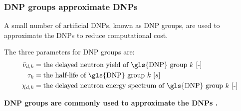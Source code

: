 \begin{frame}
  \frametitle{DNP groups approximate DNPs}
        A small number of artificial \glspl{DNP}, known as \gls{DNP} groups, are used to approximate the \glspl{DNP} to reduce computational cost.

        \begin{block}{The three parameters for \gls{DNP} groups are:}
            \[
            \begin{aligned}
                \bar{\nu}_{d, k} &= \text{the delayed neutron yield of \gls{DNP} group $k$ [-]} \\
                \tau_k &= \text{the half-life of \gls{DNP} group $k$ [$s$]} \\
                \chi_{d, k} &= \text{the delayed neutron energy spectrum of \gls{DNP} group $k$ [-]} \\
            \end{aligned}
            \]
        \end{block}
        \textbf{\gls{DNP} groups are commonly used to approximate the \glspl{DNP} \cite{brady1989delayed}.}
\end{frame}